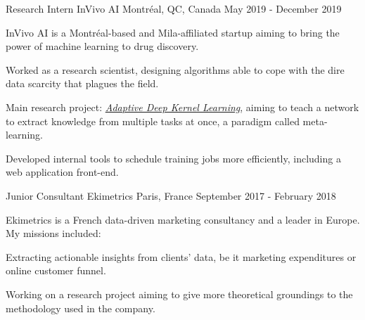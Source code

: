 

\begin{cventries}

    \cventry
    {Research Intern} %
    {InVivo AI} %
    {Montréal, QC, Canada} %
    {May 2019 - December 2019} %
    {
        InVivo AI is a Montréal-based and Mila-affiliated startup aiming to bring the power of machine learning to drug discovery.
        \vspace{5mm}
        \begin{cvitems} %
            \item Worked as a research scientist, designing algorithms able to cope with the dire data scarcity that plagues the field.
            \item Main research project: \href{https://arxiv.org/pdf/1905.12131.pdf}{\textit{Adaptive Deep Kernel Learning}\acvHeaderIconSep\faLink}, aiming to teach a network to extract knowledge from multiple tasks at once, a paradigm called meta-learning.
            \item Developed internal tools to schedule training jobs more efficiently, including a web application front-end.
        \end{cvitems}
    }
    
    \cventry
    {Junior Consultant} %
    {Ekimetrics} %
    {Paris, France} %
    {September 2017 - February 2018} %
    {
        Ekimetrics is a French data-driven marketing consultancy and a leader in Europe. My missions included:
        \vspace{5mm}
        \begin{cvitems} %
            \item Extracting actionable insights from clients' data, be it marketing expenditures or online customer funnel.
            \item Working on a research project aiming to give more theoretical groundings to the methodology used in the company.
        \end{cvitems}
    }
    

\end{cventries}
